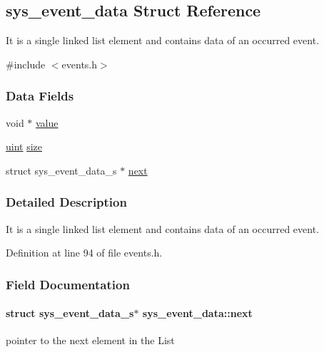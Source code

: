 \hypertarget{structsys__event__data}{}\subsection{sys\+\_\+event\+\_\+data Struct Reference}
\label{structsys__event__data}


It is a single linked list element and contains data of an occurred event.  




{\ttfamily \#include $<$events.\+h$>$}

\subsubsection*{Data Fields}
\begin{DoxyCompactItemize}
\item 
void $\ast$ \hyperlink{structsys__event__data_a31efcfa64109da1bf1cebf0d9ca48ebc}{value}
\item 
\hyperlink{definitions_8h_a1445ebbbf93d62972255ec5e89a5ab01}{uint} \hyperlink{structsys__event__data_a73d372cbbe27f6c6343b9c31326be6a1}{size}
\item 
struct sys\+\_\+event\+\_\+data\+\_\+s $\ast$ \hyperlink{structsys__event__data_ade11205353fbbc40616059edaf791fa7}{next}
\end{DoxyCompactItemize}


\subsubsection{Detailed Description}
It is a single linked list element and contains data of an occurred event. 

Definition at line 94 of file events.\+h.



\subsubsection{Field Documentation}
\hypertarget{structsys__event__data_ade11205353fbbc40616059edaf791fa7}{}
\paragraph[{next}]{\setlength{\rightskip}{0pt plus 5cm}struct sys\+\_\+event\+\_\+data\+\_\+s$\ast$ sys\+\_\+event\+\_\+data\+::next}\label{structsys__event__data_ade11205353fbbc40616059edaf791fa7}
pointer to the next element in the List 

